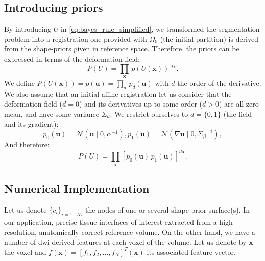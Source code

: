 \subsection{Introducing priors}
\label{sec:priors}
%
By introducing $U$ in \eqref{eq:bayes_rule_simplified}, we transformed 
the segmentation problem into a registration one provided with $\Omega_0$ 
(the initial partition) is derived from the shape-priors given in reference 
space. Therefore, the priors can be expressed in terms of the deformation
field:
\begin{equation}
P(U) = \underset{\mathbf{x}}{\prod}\,p(U(\mathbf{x}))\,^{d\mathbf{x}}.
\label{eq:prior_u}
\end{equation}
We define $P(U(\mathbf{x})) = p(\mathbf{u}) = \underset{d}\prod \, p_d(\mathbf{u})$ 
with $d$ the order of the derivative. We also assume that an initial
affine registration let us consider that the deformation field ($d=0$)
and its derivatives up to some order ($d>0$) are all zero mean, and
have some variance $\Sigma_d$. We restrict ourselves to $d=\lbrace 0,1 \rbrace$
(the field and its gradient):
\begin{subequations}
\begin{equation}
p_0(\mathbf{u}) = \mathcal{N}( \mathbf{u} \mid 0, \alpha^{-1}),
\end{equation}
\begin{equation}
p_1(\mathbf{u}) = \mathcal{N}( \nabla \mathbf{u} \mid 0, {\Sigma_\beta}^{-1}), 
\end{equation}
\end{subequations}
And therefore:
\begin{equation}
P(U) = \underset{\mathbf{x}}\prod \left[ p_0(\mathbf{u}) \, p_1(\mathbf{u}) \right]^{d\mathbf{x}}.
\end{equation}


\subsection{Numerical Implementation}
\label{sec:numerical_implementation}
%
Let us denote $\{c_i\}_{i=1 \ldots N_c}$ the nodes of one or several shape-prior
surface(s). In our application, precise tissue interfaces of interest 
extracted from a high-resolution, anatomically correct reference volume. 
On the other hand, we have a number of \gls{dwi}-derived features at each
voxel of the volume. Let us denote by $\mathbf{x}$ the voxel and $f(\mathbf{x}) = 
[ f_1, f_2, \ldots, f_N]^T(\mathbf{x})$ its associated feature vector.

